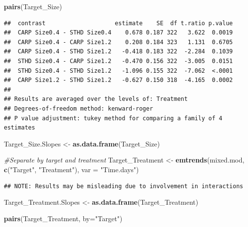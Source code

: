 \documentclass[
]{article}
\newenvironment{Shaded}{\begin{snugshade}}{\end{snugshade}}
\newcommand{\AttributeTok}[1]{\textcolor[rgb]{0.13,0.29,0.53}{#1}}
\newcommand{\CommentTok}[1]{\textcolor[rgb]{0.56,0.35,0.01}{\textit{#1}}}
\newcommand{\FunctionTok}[1]{\textcolor[rgb]{0.13,0.29,0.53}{\textbf{#1}}}
\newcommand{\NormalTok}[1]{#1}
\newcommand{\OtherTok}[1]{\textcolor[rgb]{0.56,0.35,0.01}{#1}}
\newcommand{\StringTok}[1]{\textcolor[rgb]{0.31,0.60,0.02}{#1}}
\begin{document}
\begin{Shaded}
\begin{Highlighting}[]
\FunctionTok{pairs}\NormalTok{(Target\_Size)}
\end{Highlighting}
\end{Shaded}

\begin{verbatim}
##  contrast                    estimate    SE  df t.ratio p.value
##  CARP Size0.4 - STHD Size0.4    0.678 0.187 322   3.622  0.0019
##  CARP Size0.4 - CARP Size1.2    0.208 0.184 323   1.131  0.6705
##  CARP Size0.4 - STHD Size1.2   -0.418 0.183 322  -2.284  0.1039
##  STHD Size0.4 - CARP Size1.2   -0.470 0.156 322  -3.005  0.0151
##  STHD Size0.4 - STHD Size1.2   -1.096 0.155 322  -7.062  <.0001
##  CARP Size1.2 - STHD Size1.2   -0.627 0.150 318  -4.165  0.0002
## 
## Results are averaged over the levels of: Treatment 
## Degrees-of-freedom method: kenward-roger 
## P value adjustment: tukey method for comparing a family of 4 estimates
\end{verbatim}

\begin{Shaded}
\begin{Highlighting}[]
\NormalTok{Target\_Size.Slopes }\OtherTok{\textless{}{-}} \FunctionTok{as.data.frame}\NormalTok{(Target\_Size)}

\CommentTok{\#Separate by target and treatment}
\NormalTok{Target\_Treatment }\OtherTok{\textless{}{-}} \FunctionTok{emtrends}\NormalTok{(mixed.mod, }\FunctionTok{c}\NormalTok{(}\StringTok{"Target"}\NormalTok{, }\StringTok{"Treatment"}\NormalTok{), }\AttributeTok{var =} \StringTok{"Time.days"}\NormalTok{)}
\end{Highlighting}
\end{Shaded}

\begin{verbatim}
## NOTE: Results may be misleading due to involvement in interactions
\end{verbatim}

\begin{Shaded}
\begin{Highlighting}[]
\NormalTok{Target\_Treatment.Slopes }\OtherTok{\textless{}{-}} \FunctionTok{as.data.frame}\NormalTok{(Target\_Treatment)}

\FunctionTok{pairs}\NormalTok{(Target\_Treatment, }\AttributeTok{by=}\StringTok{"Target"}\NormalTok{)}
\end{Highlighting}
\end{Shaded}
\end{document}
